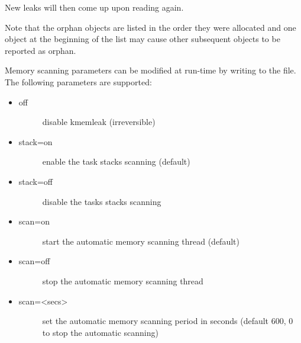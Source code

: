 \documentclass[a4paper,8pt,english]{sphinxmanual}
\begin{document}
New leaks will then come up upon reading 
again.

Note that the orphan objects are listed in the order they were allocated
and one object at the beginning of the list may cause other subsequent
objects to be reported as orphan.

Memory scanning parameters can be modified at run-time by writing to the
 file. The following parameters are supported:
\begin{itemize}
\item {} \begin{description}
\item[{off}] \leavevmode
disable kmemleak (irreversible)

\end{description}

\item {} \begin{description}
\item[{stack=on}] \leavevmode
enable the task stacks scanning (default)

\end{description}

\item {} \begin{description}
\item[{stack=off}] \leavevmode
disable the tasks stacks scanning

\end{description}

\item {} \begin{description}
\item[{scan=on}] \leavevmode
start the automatic memory scanning thread (default)

\end{description}

\item {} \begin{description}
\item[{scan=off}] \leavevmode
stop the automatic memory scanning thread

\end{description}

\item {} \begin{description}
\item[{scan=\textless{}secs\textgreater{}}] \leavevmode
set the automatic memory scanning period in seconds
(default 600, 0 to stop the automatic scanning)


\end{description}
\end{itemize}
\end{document}
